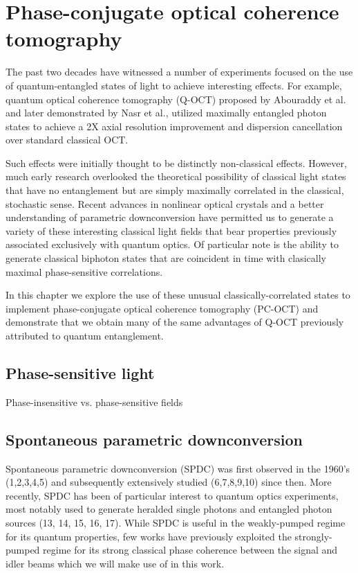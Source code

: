 \chapter{Phase-conjugate optical coherence tomography}

The past two decades have witnessed a number of experiments focused on the use of quantum-entangled states of light to achieve interesting effects. For example, quantum optical coherence tomography (Q-OCT) proposed by Abouraddy et al. and later demonstrated by Nasr et al., utilized maximally entangled photon states to achieve a 2X axial resolution improvement and dispersion cancellation over standard classical OCT.

Such effects were initially thought to be distinctly non-classical effects. However, much early research overlooked the theoretical possibility of classical light states that have no entanglement but are simply maximally correlated in the classical, stochastic sense. Recent advances in nonlinear optical crystals and a better understanding of parametric downconversion have permitted us to generate a variety of these interesting classical light fields that bear properties previously associated exclusively with quantum optics. Of particular note is the ability to generate classical biphoton states that are coincident in time with clasically maximal phase-sensitive correlations.

In this chapter we explore the use of these unusual classically-correlated states to implement phase-conjugate optical coherence tomography (PC-OCT) and demonstrate that we obtain many of the same advantages of Q-OCT previously attributed to quantum entanglement.

\section{Phase-sensitive light}

Phase-insensitive vs. phase-sensitive fields

\section{Spontaneous parametric downconversion}

Spontaneous parametric downconversion (SPDC) was first observed in the 1960's (1,2,3,4,5) and subsequently extensively studied (6,7,8,9,10) since then. More recently, SPDC has been of particular interest to quantum optics experiments, most notably used to generate heralded single photons and entangled photon sources (13, 14, 15, 16, 17). While SPDC is useful in the weakly-pumped regime for its quantum properties, few works have previously exploited the strongly-pumped regime for its strong classical phase coherence between the signal and idler beams which we will make use of in this work.

